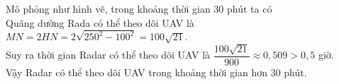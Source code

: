 \begin{ex}
{\begin{itemchoice}
\begin{center}
		\end{center}
		Mô phỏng như hình vẽ, trong khoảng thời  gian $30$ phút ta có\\
		 Quãng dường Rada có thể theo dõi UAV là $MN=2HN=2\sqrt{250^2-100^2}=100\sqrt{21}$.\\
		Suy ra thời gian Radar có thể theo dõi UAV là $\dfrac{100 \sqrt{21}}{900}  \approx 0{,}509>0{,}5$ giờ.\\
		Vậy Radar có thể theo dõi UAV  trong khoảng thời gian hơn $30$ phút.
	\end{itemchoice}
 }
\end{ex}

